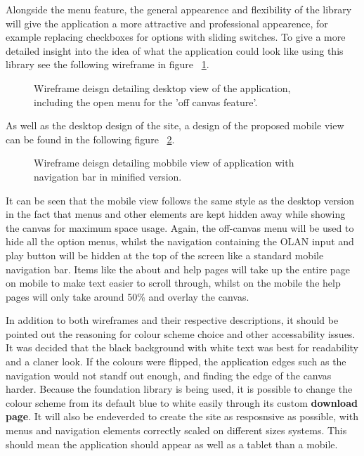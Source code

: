 Alongside the menu feature, the general appearence and flexibility of the library will give the application a more attractive and professional appearence, for example replacing checkboxes for options with sliding switches. To give a more detailed insight into the idea of what the application could look like using this library see the following wireframe in figure ~\ref{fig:wiredesktop}.

\begin{figure}[h!]
  \centering
  \caption{Wireframe deisgn detailing desktop view of the application, including the open menu for the 'off canvas feature'.}
  \label{fig:wiredesktop}
\end{figure}

As well as the desktop design of the site, a design of the proposed mobile view can be found in the following figure ~\ref{fig:wiremobile}.

\begin{figure}[h!]
  \centering
  \caption{Wireframe deisgn detailing mobbile view of application with navigation bar in minified version.}
  \label{fig:wiremobile}
\end{figure}

It can be seen that the mobile view follows the same style as the desktop version in the fact that menus and other elements are kept hidden away while showing the canvas for maximum space usage. Again, the off-canvas menu will be used to hide all the option menus, whilst the navigation containing the OLAN input and play button will be hidden at the top of the screen like a standard mobile navigation bar. Items like the about and help pages will take up the entire page on mobile to make text easier to scroll through, whilst on the mobile the help pages will only take around 50\% and overlay the canvas. 

In addition to both wireframes and their respective descriptions, it should be pointed out the reasoning for colour scheme choice and other accessability issues. It was decided that the black background with white text was best for readability and a claner look. If the colours were flipped, the application edges such as the navigation would not standf out enough, and finding the edge of the canvas harder. Because the foundation library is being used, it is possible to change the colour scheme from its default blue to white easily through its custom \textbf{download page}. It will also be endeverded to create the site as resposnsive as possible, with menus and navigation elements correctly scaled on different sizes systems. This should mean the application should appear as well as a tablet than a mobile.

